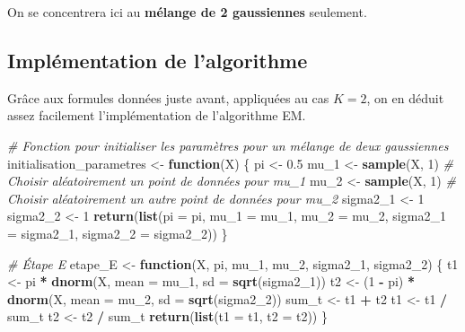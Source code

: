 \documentclass[
]{article}
\newenvironment{Shaded}{\begin{snugshade}}{\end{snugshade}}
\newcommand{\AttributeTok}[1]{\textcolor[rgb]{0.13,0.29,0.53}{#1}}
\newcommand{\CommentTok}[1]{\textcolor[rgb]{0.56,0.35,0.01}{\textit{#1}}}
\newcommand{\ControlFlowTok}[1]{\textcolor[rgb]{0.13,0.29,0.53}{\textbf{#1}}}
\newcommand{\DecValTok}[1]{\textcolor[rgb]{0.00,0.00,0.81}{#1}}
\newcommand{\FloatTok}[1]{\textcolor[rgb]{0.00,0.00,0.81}{#1}}
\newcommand{\FunctionTok}[1]{\textcolor[rgb]{0.13,0.29,0.53}{\textbf{#1}}}
\newcommand{\NormalTok}[1]{#1}
\newcommand{\OtherTok}[1]{\textcolor[rgb]{0.56,0.35,0.01}{#1}}
\newcommand{\SpecialCharTok}[1]{\textcolor[rgb]{0.81,0.36,0.00}{\textbf{#1}}}
\begin{document}
On se concentrera ici au \textbf{mélange de 2 gaussiennes} seulement.

\hypertarget{impluxe9mentation-de-lalgorithme}{%
\subsection{Implémentation de
l'algorithme}\label{impluxe9mentation-de-lalgorithme}}

Grâce aux formules données juste avant, appliquées au cas \(K=2\), on en
déduit assez facilement l'implémentation de l'algorithme EM.

\begin{Shaded}
\begin{Highlighting}[]
\CommentTok{\# Fonction pour initialiser les paramètres pour un mélange de deux gaussiennes}
\NormalTok{initialisation\_parametres }\OtherTok{\textless{}{-}} \ControlFlowTok{function}\NormalTok{(X) \{}
\NormalTok{  pi }\OtherTok{\textless{}{-}} \FloatTok{0.5}
\NormalTok{  mu\_1 }\OtherTok{\textless{}{-}} \FunctionTok{sample}\NormalTok{(X, }\DecValTok{1}\NormalTok{) }\CommentTok{\# Choisir aléatoirement un point de données pour mu\_1}
\NormalTok{  mu\_2 }\OtherTok{\textless{}{-}} \FunctionTok{sample}\NormalTok{(X, }\DecValTok{1}\NormalTok{) }\CommentTok{\# Choisir aléatoirement un autre point de données pour mu\_2}
\NormalTok{  sigma2\_1 }\OtherTok{\textless{}{-}} \DecValTok{1}
\NormalTok{  sigma2\_2 }\OtherTok{\textless{}{-}} \DecValTok{1}
  \FunctionTok{return}\NormalTok{(}\FunctionTok{list}\NormalTok{(}\AttributeTok{pi =}\NormalTok{ pi, }\AttributeTok{mu\_1 =}\NormalTok{ mu\_1, }\AttributeTok{mu\_2 =}\NormalTok{ mu\_2, }\AttributeTok{sigma2\_1 =}\NormalTok{ sigma2\_1, }\AttributeTok{sigma2\_2 =}\NormalTok{ sigma2\_2))}
\NormalTok{\}}

\CommentTok{\# Étape E}
\NormalTok{etape\_E }\OtherTok{\textless{}{-}} \ControlFlowTok{function}\NormalTok{(X, pi, mu\_1, mu\_2, sigma2\_1, sigma2\_2) \{}
\NormalTok{  t1 }\OtherTok{\textless{}{-}}\NormalTok{ pi }\SpecialCharTok{*} \FunctionTok{dnorm}\NormalTok{(X, }\AttributeTok{mean =}\NormalTok{ mu\_1, }\AttributeTok{sd =} \FunctionTok{sqrt}\NormalTok{(sigma2\_1))}
\NormalTok{  t2 }\OtherTok{\textless{}{-}}\NormalTok{ (}\DecValTok{1} \SpecialCharTok{{-}}\NormalTok{ pi) }\SpecialCharTok{*} \FunctionTok{dnorm}\NormalTok{(X, }\AttributeTok{mean =}\NormalTok{ mu\_2, }\AttributeTok{sd =} \FunctionTok{sqrt}\NormalTok{(sigma2\_2))}
\NormalTok{  sum\_t }\OtherTok{\textless{}{-}}\NormalTok{ t1 }\SpecialCharTok{+}\NormalTok{ t2}
\NormalTok{  t1 }\OtherTok{\textless{}{-}}\NormalTok{ t1 }\SpecialCharTok{/}\NormalTok{ sum\_t}
\NormalTok{  t2 }\OtherTok{\textless{}{-}}\NormalTok{ t2 }\SpecialCharTok{/}\NormalTok{ sum\_t}
  \FunctionTok{return}\NormalTok{(}\FunctionTok{list}\NormalTok{(}\AttributeTok{t1 =}\NormalTok{ t1, }\AttributeTok{t2 =}\NormalTok{ t2))}
\NormalTok{\}}


\end{Highlighting}
\end{Shaded}
\end{document}
